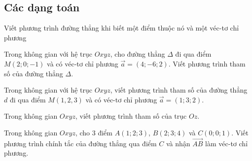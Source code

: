 \subsection{Các dạng toán}
\begin{dang}{Viết phương trình đường thẳng khi biết một điểm thuộc nó và một véc-tơ chỉ phương}
\end{dang}
\begin{vd}%
	Trong không gian với hệ trục $Oxyz$, cho đường thẳng $\Delta $ đi qua điểm $M(2;0;-1)$ và có véc-tơ chỉ phương $\vec{a}=\left(4;-6;2\right)$. Viết  phương trình tham số của đường thẳng $\Delta $.

\end{vd}
\begin{vd}%
Trong không gian với hệ trục $Oxyz$, viết phương trình tham số của đường thẳng $d$ đi qua điểm $M(1,2,3)$ và có véc-tơ chỉ phương $\vec{a}=(1;3;2)$.
\end{vd}
\begin{vd}%
Trong không gian $Oxyz$, viết phương trình tham số của trục $Oz$.

\end{vd}
\begin{vd}%
	Trong không gian $Oxyz$, cho $3$ điểm $A(1;2;3)$, $B(2;3;4)$ và $C(0;0;1)$. Viết phương trình chính tắc của đường thẳng qua điểm $C$ và nhận $\overrightarrow{AB}$ làm véc-tơ chỉ phương.
	\end{vd}

